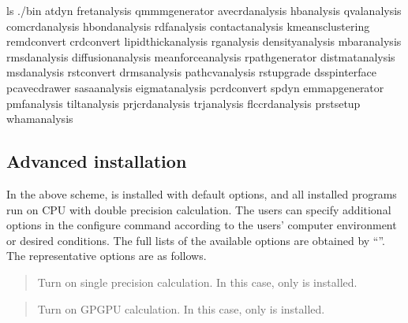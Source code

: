 \documentclass[a4paper,11pt,oneside,english]{sphinxmanual}
\begin{document}
\begin{sphinxVerbatim}[commandchars=\\\{\}]
\PYGZdl{} ls ./bin
atdyn               fret\PYGZus{}analysis        qmmm\PYGZus{}generator
avecrd\PYGZus{}analysis     hb\PYGZus{}analysis          qval\PYGZus{}analysis
comcrd\PYGZus{}analysis     hbond\PYGZus{}analysis       rdf\PYGZus{}analysis
contact\PYGZus{}analysis    kmeans\PYGZus{}clustering    remd\PYGZus{}convert
crd\PYGZus{}convert         lipidthick\PYGZus{}analysis  rg\PYGZus{}analysis
density\PYGZus{}analysis    mbar\PYGZus{}analysis        rmsd\PYGZus{}analysis
diffusion\PYGZus{}analysis  meanforce\PYGZus{}analysis   rpath\PYGZus{}generator
distmat\PYGZus{}analysis    msd\PYGZus{}analysis         rst\PYGZus{}convert
drms\PYGZus{}analysis       pathcv\PYGZus{}analysis      rst\PYGZus{}upgrade
dssp\PYGZus{}interface      pcavec\PYGZus{}drawer        sasa\PYGZus{}analysis
eigmat\PYGZus{}analysis     pcrd\PYGZus{}convert         spdyn
emmap\PYGZus{}generator     pmf\PYGZus{}analysis         tilt\PYGZus{}analysis
prjcrd\PYGZus{}analysis     trj\PYGZus{}analysis         flccrd\PYGZus{}analysis
prst\PYGZus{}setup          wham\PYGZus{}analysis
\end{sphinxVerbatim}

\clearpage


\subsection{Advanced installation}
\label{\detokenize{01_Getting_Started:advanced-installation}}\label{\detokenize{01_Getting_Started:id2}}
In the above scheme,  is installed with default options,
and all installed programs run on CPU with double precision calculation.
The users can specify additional options in the configure command
according to the users’ computer environment or desired conditions.
The full lists of the available options are obtained by “”.
The representative options are as follows.

\begin{quote}

Turn on single precision calculation. In this case, only  is installed.
\end{quote}

\begin{quote}

Turn on GPGPU calculation. In this case, only  is installed.
\end{quote}
\end{document}
